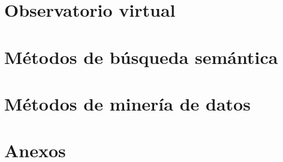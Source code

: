 \documentclass[openany]{book}
\begin{document}

\frontmatter
\pagestyle{fancy}


\renewcommand{\listfigurename}{Índice de imágenes}
\renewcommand{\listtablename}{Índice de tablas}
\renewcommand{\figurename}{Imagen}
\renewcommand{\tablename}{Tabla}
\tableofcontents
{}
\listoftables
{}
\listoffigures
{}




\mainmatter
\part{Observatorio virtual}







\part{M\'etodos de búsqueda semántica}


\part{M\'etodos de minería de datos}


\part{Anexos}
\appendix


\backmatter


\end{document}
